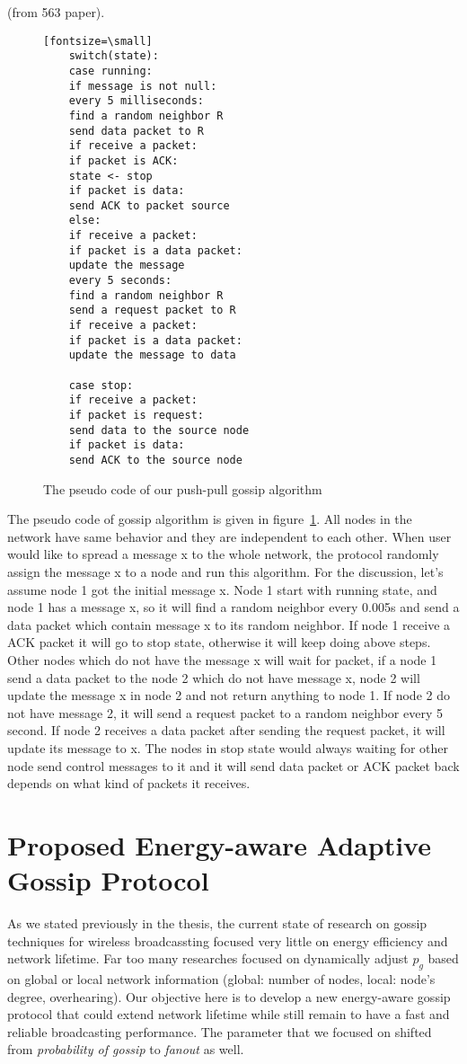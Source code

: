 (from 563 paper).

\begin{figure}
	\centering
	\begin{verbatim}[fontsize=\small]
	switch(state):
	case running:
	if message is not null:
	every 5 milliseconds:
	find a random neighbor R
	send data packet to R
	if receive a packet:
	if packet is ACK:
	state <- stop
	if packet is data:
	send ACK to packet source
	else:
	if receive a packet:
	if packet is a data packet:
	update the message
	every 5 seconds:
	find a random neighbor R
	send a request packet to R
	if receive a packet:
	if packet is a data packet:
	update the message to data
	
	case stop:
	if receive a packet:
	if packet is request:
	send data to the source node
	if packet is data:
	send ACK to the source node
	\end{verbatim}
	\caption{The pseudo code of our push-pull gossip algorithm}
	\label{fig:pseudo}
\end{figure}

The pseudo code of gossip algorithm is given in figure~\ref{fig:pseudo}. All nodes in the network have same behavior and they are independent to each other. When user would like to spread a message x to the whole network, the protocol randomly assign the message x to a node and run this algorithm. For the discussion, let's assume node 1 got the initial message x. Node 1 start with running state, and node 1 has a message x, so it will find a random neighbor every 0.005s and send a data packet which contain message x to its random neighbor. If node 1 receive a ACK packet it will go to stop state, otherwise it will keep doing above steps. Other nodes which do not have the message x will wait for packet, if a node 1 send a data packet to the node 2 which do not have message x, node 2 will update the message x in node 2 and not return anything to node 1. If node 2 do not have message 2, it will send a request packet to a random neighbor every 5 second. If node 2 receives a data packet after sending the request packet, it will update its message to x. The nodes in stop state would always waiting for other node send control messages to it and it will send data packet or ACK packet back depends on what kind of packets it receives.

\section{Proposed Energy-aware Adaptive Gossip Protocol}
As we stated previously in the thesis, the current state of research on gossip techniques for wireless broadcassting focused very little on energy efficiency and network lifetime. Far too many researches focused on dynamically adjust $p_g$ based on global or local network information (global: number of nodes, local: node's degree, overhearing). Our objective here is to develop a new energy-aware gossip protocol that could extend network lifetime while still remain to have a fast and reliable broadcasting performance. The parameter that we focused on shifted from \emph{probability of gossip} to \emph{fanout} as well. 

